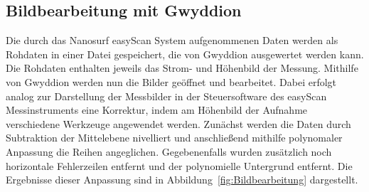 \documentclass[a4paper,twoside,final]{article}
\begin{document}
\subsection{Bildbearbeitung mit Gwyddion}
Die durch das Nanosurf easyScan System aufgenommenen Daten werden als Rohdaten in einer Datei gespeichert, die von Gwyddion ausgewertet werden kann. Die Rohdaten enthalten jeweils das Strom- und Höhenbild der Messung. Mithilfe von Gwyddion werden nun die Bilder geöffnet und bearbeitet. Dabei erfolgt analog zur Darstellung der Messbilder in der Steuersoftware des easyScan Messinstruments eine Korrektur, indem am Höhenbild der Aufnahme verschiedene Werkzeuge angewendet werden. Zunächst werden die Daten durch Subtraktion der Mittelebene nivelliert und anschließend mithilfe polynomaler Anpassung die Reihen angeglichen. Gegebenenfalls wurden zusätzlich noch horizontale Fehlerzeilen entfernt und der polynomielle Untergrund entfernt. Die Ergebnisse dieser Anpassung sind in Abbildung~\ref{fig:Bildbearbeitung} dargestellt.
\end{document}
